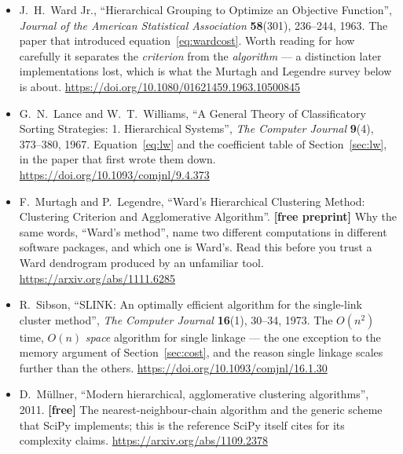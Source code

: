 \documentclass[11pt]{article}
\begin{document}
\begin{itemize}[leftmargin=*]
  \item J.\ H.\ Ward Jr., ``Hierarchical Grouping to Optimize an Objective
    Function'', \emph{Journal of the American Statistical Association}
    \textbf{58}(301), 236--244, 1963. The paper that introduced
    equation~\eqref{eq:wardcost}. Worth reading for how carefully it separates
    the \emph{criterion} from the \emph{algorithm} --- a distinction later
    implementations lost, which is what the Murtagh and Legendre survey below
    is about. \url{https://doi.org/10.1080/01621459.1963.10500845}
  \item G.\ N.\ Lance and W.\ T.\ Williams, ``A General Theory of
    Classificatory Sorting Strategies: 1. Hierarchical Systems'', \emph{The
    Computer Journal} \textbf{9}(4), 373--380, 1967. Equation~\eqref{eq:lw}
    and the coefficient table of Section~\ref{sec:lw}, in the paper that first
    wrote them down. \url{https://doi.org/10.1093/comjnl/9.4.373}
  \item F.\ Murtagh and P.\ Legendre, ``Ward's Hierarchical Clustering
    Method: Clustering Criterion and Agglomerative Algorithm''. \textbf{[free
    preprint]} Why the same words, ``Ward's method'', name two different
    computations in different software packages, and which one is Ward's. Read
    this before you trust a Ward dendrogram produced by an unfamiliar tool.
    \url{https://arxiv.org/abs/1111.6285}
  \item R.\ Sibson, ``SLINK: An optimally efficient algorithm for the
    single-link cluster method'', \emph{The Computer Journal} \textbf{16}(1),
    30--34, 1973. The $O(n^2)$ time, $O(n)$ \emph{space} algorithm for single
    linkage --- the one exception to the memory argument of
    Section~\ref{sec:cost}, and the reason single linkage scales further than
    the others. \url{https://doi.org/10.1093/comjnl/16.1.30}
  \item D.\ M\"ullner, ``Modern hierarchical, agglomerative clustering
    algorithms'', 2011. \textbf{[free]} The nearest-neighbour-chain algorithm
    and the generic scheme that SciPy implements; this is the reference SciPy
    itself cites for its complexity claims.
    \url{https://arxiv.org/abs/1109.2378}
\end{itemize}

\notesources{\AMLUnitVIISources}
\end{document}
